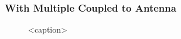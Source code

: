 		\subsubsection{\Nd With Multiple \sivs Coupled to Antenna}

			\begin{figure}[tp]
				\begin{subfigure}[t]{ 0.49\linewidth}
					\centering
					\caption{}
					\label{subfig::antenna_laser_scan}
				\end{subfigure}
				\hfill
				\begin{subfigure}[t]{ 0.49\linewidth}
					\centering
					\caption{
					}
					\label{subfig::antenna_bowtie_laser_scan}
				\end{subfigure}
				\caption{<caption>}
			\end{figure}

